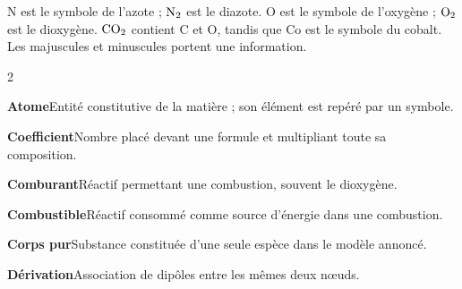 N est le symbole de l’azote ; $\ce{N2}$ est le diazote. O est le symbole de l’oxygène ; $\ce{O2}$ est le dioxygène. $\ce{CO2}$ contient C et O, tandis que Co est le symbole du cobalt. Les majuscules et minuscules portent une information.
\label{lexique}
\begingroup\fontsize{10.5}{13.5}\selectfont\begin{multicols}{2}
\par\addvspace{2mm}\noindent\begin{minipage}{\linewidth}\textbf{Atome}\enspace Entité constitutive de la matière ; son élément est repéré par un symbole.\par\end{minipage}\par
\par\addvspace{2mm}\noindent\begin{minipage}{\linewidth}\textbf{Coefficient}\enspace Nombre placé devant une formule et multipliant toute sa composition.\par\end{minipage}\par
\par\addvspace{2mm}\noindent\begin{minipage}{\linewidth}\textbf{Comburant}\enspace Réactif permettant une combustion, souvent le dioxygène.\par\end{minipage}\par
\par\addvspace{2mm}\noindent\begin{minipage}{\linewidth}\textbf{Combustible}\enspace Réactif consommé comme source d’énergie dans une combustion.\par\end{minipage}\par
\par\addvspace{2mm}\noindent\begin{minipage}{\linewidth}\textbf{Corps pur}\enspace Substance constituée d’une seule espèce dans le modèle annoncé.\par\end{minipage}\par
\par\addvspace{2mm}\noindent\begin{minipage}{\linewidth}\textbf{Dérivation}\enspace Association de dipôles entre les mêmes deux nœuds.\par\end{minipage}\par

\end{multicols}
